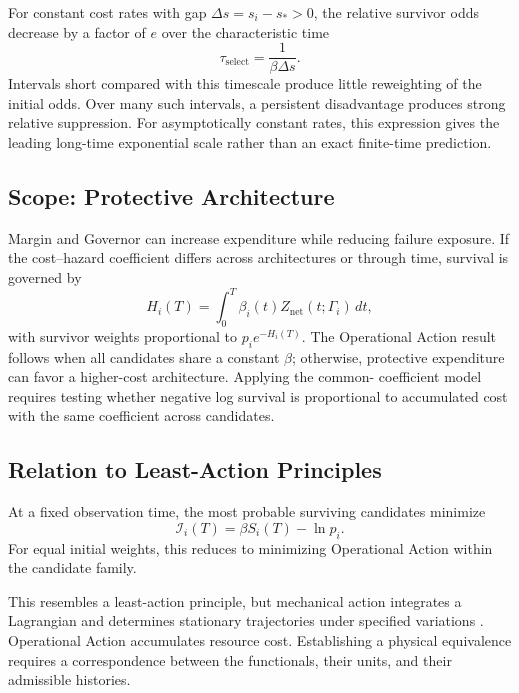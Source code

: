 For constant cost rates with gap $\Delta s=s_i-s_*>0$,
the relative survivor odds decrease by a factor of $e$
over the characteristic time
\begin{equation}
\label{eq:selection_timescale}
    \tau_{\mathrm{select}}
    =\frac{1}{\beta\Delta s}.
\end{equation}
Intervals short compared with this timescale produce little
reweighting of the initial odds. Over many such intervals,
a persistent disadvantage produces strong relative suppression.
For asymptotically constant rates, this expression gives the
leading long-time exponential scale rather than an exact
finite-time prediction.

\subsection{Scope: Protective Architecture}
\label{subsec:protective_architecture}

Margin and Governor can increase expenditure while reducing
failure exposure. If the cost--hazard coefficient differs
across architectures or through time, survival is governed by
\begin{equation}
\label{eq:cumulative_hazard}
    H_i(T)=\int_0^T
    \beta_i(t)Z_{\mathrm{net}}(t;\Gamma_i)\,dt,
\end{equation}
with survivor weights proportional to $p_i e^{-H_i(T)}$.
The Operational Action result follows when all candidates
share a constant $\beta$; otherwise, protective expenditure
can favor a higher-cost architecture. Applying the common-
coefficient model requires testing whether negative log
survival is proportional to accumulated cost with the same
coefficient across candidates.

\subsection{Relation to Least-Action Principles}
\label{subsec:relation_to_least_action}

At a fixed observation time, the most probable surviving candidates minimize
\begin{equation}
\label{eq:effective_selection_cost}
    \mathcal{I}_i(T)=\beta S_i(T)-\ln p_i.
\end{equation}
For equal initial weights, this reduces to minimizing Operational Action within the candidate family.

This resembles a least-action principle, but mechanical action integrates a Lagrangian and determines stationary trajectories under specified variations
\cite[Vol.~II, Chap.~19]{feynman_lectures_1964}.
Operational Action accumulates resource cost. Establishing a physical equivalence requires a correspondence between the functionals, their units, and their admissible histories.

